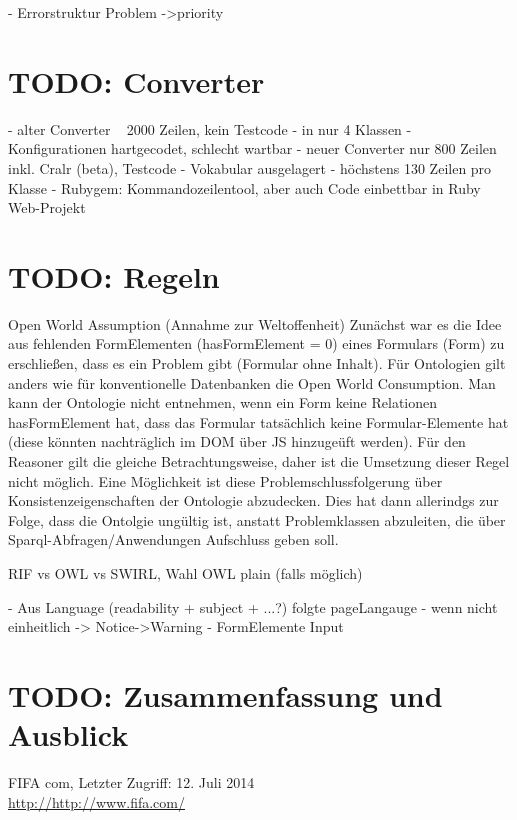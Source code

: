 \documentclass[runningheads,a4paper]{llncs}
\begin{document}
- Errorstruktur
Problem
    ->priority
\newpage

\section{TODO: Converter}

- alter Converter ~ 2000 Zeilen, kein Testcode
- in nur 4 Klassen
- Konfigurationen hartgecodet, schlecht wartbar
- neuer Converter nur 800 Zeilen inkl. Cralr (beta), Testcode
- Vokabular ausgelagert
- höchstens 130 Zeilen pro Klasse
- Rubygem: Kommandozeilentool, aber auch Code einbettbar in Ruby Web-Projekt

\section{TODO: Regeln}

Open World Assumption (Annahme zur Weltoffenheit)
Zunächst war es die Idee aus fehlenden FormElementen (hasFormElement = 0) eines Formulars (Form) zu erschließen, dass es ein Problem gibt (Formular ohne Inhalt). Für Ontologien gilt anders wie für konventionelle Datenbanken die Open World Consumption. Man kann der Ontologie nicht entnehmen, wenn ein Form keine Relationen hasFormElement hat, dass das Formular tatsächlich keine Formular-Elemente hat (diese könnten nachträglich im DOM über JS hinzugeüft werden).
Für den Reasoner gilt die gleiche Betrachtungsweise, daher ist die Umsetzung dieser Regel nicht möglich.
Eine Möglichkeit ist diese Problemschlussfolgerung über Konsistenzeigenschaften der Ontologie abzudecken. Dies hat dann allerindgs  zur Folge, dass die Ontolgie ungültig ist, anstatt Problemklassen abzuleiten, die über Sparql-Abfragen/Anwendungen Aufschluss geben soll.

RIF vs OWL vs SWIRL, Wahl OWL plain (falls möglich)

- Aus Language (readability + subject + ...?) folgte pageLangauge
- wenn nicht einheitlich -> Notice->Warning
- FormElemente Input

\newpage
\section{TODO: Zusammenfassung und Ausblick}




\begin{thebibliography}{4}

FIFA com,
Letzter Zugriff: 12. Juli 2014\\
\url{http://http://www.fifa.com/}

\end{thebibliography}
\end{document}

